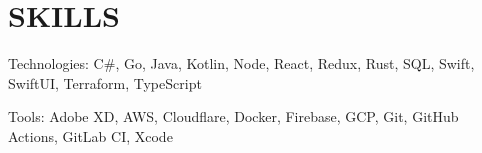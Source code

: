 \section{SKILLS}
\begin{bulletlist}
   \item{Technologies: C\#, Go, Java, Kotlin, Node, React, Redux, Rust, SQL, Swift, SwiftUI, Terraform, TypeScript}
   \item{Tools: Adobe XD, AWS, Cloudflare, Docker, Firebase, GCP, Git, GitHub Actions, GitLab CI, Xcode}
\end{bulletlist}

